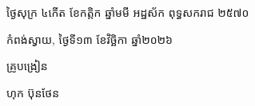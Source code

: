 \documentclass[a4paper,10pt]{article}
\begin{document}
\vspace{6pt}
{\centering
\hspace*{5.2cm}\begin{minipage}{11.5cm}
  \centering
  ថ្ងៃសុក្រ ៤កើត ខែកត្តិក ឆ្នាំមមី អដ្ឋស័ក ពុទ្ធសករាជ ២៥៧០\par
  កំពង់ស្វាយ, ថ្ងៃទី១៣ ខែវិច្ឆិកា ឆ្នាំ២០២៦\par
  \vspace{2pt}
  {\muol គ្រូបង្រៀន\par}
  \vspace{32pt}
  \hfill{\muol ហុក ប៊ុនថែន}\hspace*{1.4cm}
\end{minipage}\par}
\end{document}

